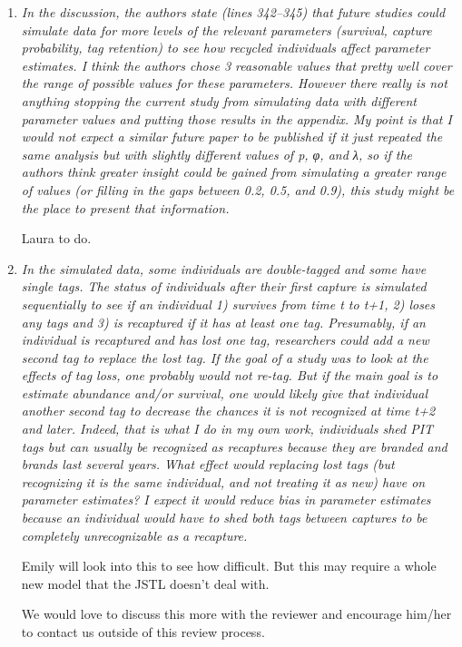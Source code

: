 \documentclass[12pt]{article}
\begin{document}
\begin{enumerate}
\item {\it In the discussion, the authors state (lines 342–345) that future studies could simulate data for more levels of the relevant parameters (survival, capture probability, tag retention) to see how recycled individuals affect parameter estimates. I think the authors chose 3 reasonable values that pretty well cover the range of possible values for these parameters. However there really is not anything stopping the current study from simulating data with different parameter values and putting those results in the appendix. My point is that I would not expect a similar future paper to be published if it just repeated the same analysis but with slightly different values of p, φ, and λ, so if the authors think greater insight could be gained from simulating a greater range of values (or filling in the gaps between 0.2, 0.5, and 0.9), this study might be the place to present that information. }

Laura to do.

\item {\it In the simulated data, some individuals are double-tagged and some have single tags. The status of individuals after their first capture is simulated sequentially to see if an individual 1) survives from time t to t+1, 2) loses any tags and 3) is recaptured if it has at least one tag. Presumably, if an individual is recaptured and has lost one tag, researchers could add a new second tag to replace the lost tag. If the goal of a study was to look at the effects of tag loss, one probably would not re-tag. But if the main goal is to estimate abundance and/or survival, one would likely give that individual another second tag to decrease the chances it is not recognized at time t+2 and later. Indeed, that is what I do in my own work, individuals shed PIT tags but can usually be recognized as recaptures because they are branded and brands last several years. What effect would replacing lost tags (but recognizing it is the same individual, and not treating it as new) have on parameter estimates? I expect it would reduce bias in parameter estimates because an individual would have to shed both tags between captures to be completely unrecognizable as a recapture.}

Emily will look into this to see how difficult.  But this may require a whole new model that the JSTL doesn't deal with.

We would love to discuss this more with the reviewer and encourage him/her to contact us outside of this review process.


\end{enumerate}
\end{document}
